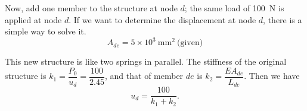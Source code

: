 \begin{minipage}[t]{0.5\textwidth}
Now, add one member to the structure at node $d$; the same load of 100~N is applied at node $d$. If we want to determine the displacement at node $d$, there is a simple way to solve it.
\begin{equation*}
  A_{de} = 5\times10^3~\mathrm{mm^2}\ \text{(given)}
\end{equation*}
\end{minipage}\hfill
\begin{minipage}[t]{0.45\textwidth}
\vspace{0pt}\centering

\end{minipage}

This new structure is like two springs in parallel. The stiffness of the original structure is $k_1 = \dfrac{P_0}{u_d} = \dfrac{100}{2.45}$, and that of member $de$ is $k_2 = \dfrac{EA_{de}}{L_{de}}$. Then we have
\begin{equation}
  u_d = \frac{100}{k_1 + k_2}.
\end{equation}

